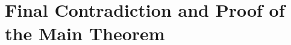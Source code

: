 \documentclass[12pt, a4paper]{amsart}
\theoremstyle{plain}
\theoremstyle{definition}
\begin{document}
\section{Final Contradiction and Proof of the Main Theorem}
\label{sec:main}

\end{document}
